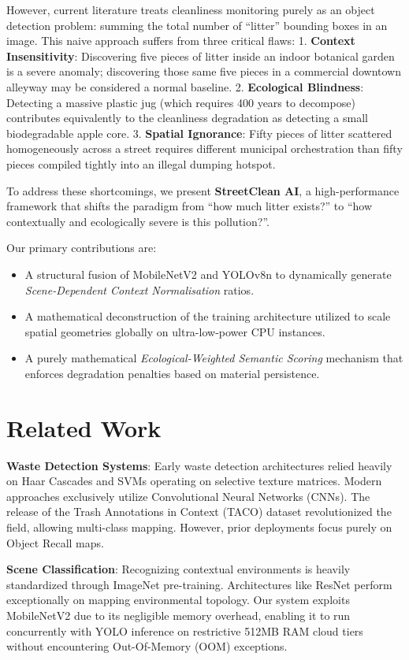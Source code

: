\documentclass[10pt,twocolumn,letterpaper]{article}
\begin{document}
However, current literature treats cleanliness monitoring purely as an object detection problem: summing the total number of ``litter'' bounding boxes in an image. This naive approach suffers from three critical flaws:
1. \textbf{Context Insensitivity}: Discovering five pieces of litter inside an indoor botanical garden is a severe anomaly; discovering those same five pieces in a commercial downtown alleyway may be considered a normal baseline.
2. \textbf{Ecological Blindness}: Detecting a massive plastic jug (which requires 400 years to decompose) contributes equivalently to the cleanliness degradation as detecting a small biodegradable apple core.
3. \textbf{Spatial Ignorance}: Fifty pieces of litter scattered homogeneously across a street requires different municipal orchestration than fifty pieces compiled tightly into an illegal dumping hotspot.

To address these shortcomings, we present \textbf{StreetClean AI}, a high-performance framework that shifts the paradigm from ``how much litter exists?'' to ``how contextually and ecologically severe is this pollution?''. 

Our primary contributions are:
\begin{itemize}
    \item A structural fusion of MobileNetV2 and YOLOv8n to dynamically generate \textit{Scene-Dependent Context Normalisation} ratios.
    \item A mathematical deconstruction of the training architecture utilized to scale spatial geometries globally on ultra-low-power CPU instances.
    \item A purely mathematical \textit{Ecological-Weighted Semantic Scoring} mechanism that enforces degradation penalties based on material persistence.
\end{itemize}

\section{Related Work}

\textbf{Waste Detection Systems}: Early waste detection architectures relied heavily on Haar Cascades and SVMs operating on selective texture matrices. Modern approaches exclusively utilize Convolutional Neural Networks (CNNs). The release of the Trash Annotations in Context (TACO) dataset revolutionized the field, allowing multi-class mapping. However, prior deployments focus purely on Object Recall maps.

\textbf{Scene Classification}: Recognizing contextual environments is heavily standardized through ImageNet pre-training. Architectures like ResNet perform exceptionally on mapping environmental topology. Our system exploits MobileNetV2 due to its negligible memory overhead, enabling it to run concurrently with YOLO inference on restrictive 512MB RAM cloud tiers without encountering Out-Of-Memory (OOM) exceptions.
\end{document}
